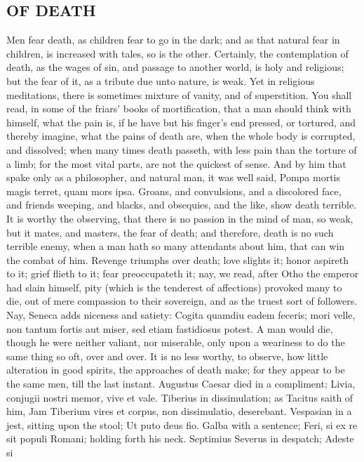 \documentclass[12pt]{article}
\begin{document}
\subsection{OF DEATH}

Men fear death, as children fear to go in the dark; and as that
natural fear in children, is increased with tales, so is the other.
Certainly, the contemplation of death, as the wages of sin, and
passage to another world, is holy and religious; but the fear of it,
as a tribute due unto nature, is weak. Yet in religious meditations,
there is sometimes mixture of vanity, and of superstition. You shall
read, in some of the friars' books of mortification, that a man should
think with himself, what the pain is, if he have but his finger's
end pressed, or tortured, and thereby imagine, what the pains of death
are, when the whole body is corrupted, and dissolved; when many
times death passeth, with less pain than the torture of a limb; for
the most vital parts, are not the quickest of sense. And by him that
spake only as a philosopher, and natural man, it was well said,
Pompa mortis magis terret, quam mors ipsa. Groans, and convulsions,
and a discolored face, and friends weeping, and blacks, and obsequies,
and the like, show death terrible. It is worthy the observing, that
there is no passion in the mind of man, so weak, but it mates, and
masters, the fear of death; and therefore, death is no such terrible
enemy, when a man hath so many attendants about him, that can win
the combat of him. Revenge triumphs over death; love slights it; honor
aspireth to it; grief flieth to it; fear preoccupateth it; nay, we
read, after Otho the emperor had slain himself, pity (which is the
tenderest of affections) provoked many to die, out of mere
compassion to their sovereign, and as the truest sort of followers.
Nay, Seneca adds niceness and satiety: Cogita quamdiu eadem feceris;
mori velle, non tantum fortis aut miser, sed etiam fastidiosus potest.
A man would die, though he were neither valiant, nor miserable, only
upon a weariness to do the same thing so oft, over and over. It is
no less worthy, to observe, how little alteration in good spirits, the
approaches of death make; for they appear to be the same men, till the
last instant. Augustus Caesar died in a compliment; Livia, conjugii
nostri memor, vive et vale. Tiberius in dissimulation; as Tacitus
saith of him, Jam Tiberium vires et corpus, non dissimulatio,
deserebant. Vespasian in a jest, sitting upon the stool; Ut puto
deus fio. Galba with a sentence; Feri, si ex re sit populi Romani;
holding forth his neck. Septimius Severus in despatch; Adeste si
\end{document}
